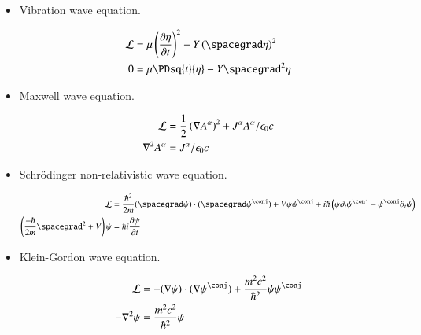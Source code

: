 \begin{itemize}

\item Vibration wave equation.

\begin{align*}
\LL &= \mu \left( \PD{t}{\eta} \right)^2 - Y \left( \spacegrad \eta \right)^2 \\
0 &= \mu \PDsq{t}{\eta} - Y \spacegrad^2 {\eta}
\end{align*}

\item Maxwell wave equation.

\begin{align*}
\mathcal{L} &= \frac{1}{2} \left( \nabla {A^\alpha} \right)^2 + J^\alpha A^\alpha / \epsilon_0 c \\
\nabla^2 A^\alpha &= J^\alpha/\epsilon_0 c 
\end{align*}

\item Schr\"{o}dinger non-relativistic wave equation.

\begin{align*}
\LL &= \frac{\hbar^2}{2m}
(\spacegrad \psi) \cdot (\spacegrad \psi^\conj) + V \psi \psi^\conj + {i \hbar} \left( \psi \partial_t \psi^\conj - \psi^\conj \partial_t \psi \right) \\
\left( \frac{-\hbar}{2m} \spacegrad^2 + V \right) \psi &= \hbar i \PD{t}{\psi}
\end{align*}

\item Klein-Gordon wave equation.

\begin{align*}
\LL &= -(\grad \psi) \cdot (\grad \psi^\conj) + \frac{m^2 c^2}{\hbar^2} \psi \psi^\conj \\
-\grad^2 \psi &= \frac{m^2 c^2}{\hbar^2} \psi
\end{align*}

\end{itemize}

%
%

%
